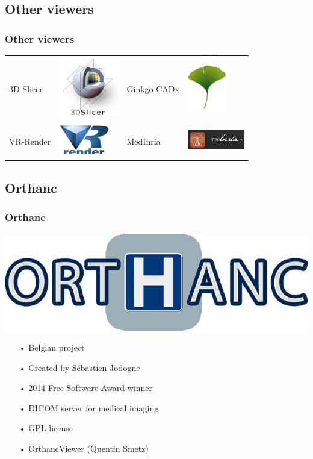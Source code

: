 \documentclass[11pt]{beamer}
\begin{document}
\subsection{Other viewers}

\begin{frame}
\frametitle{Other viewers}
\begin{tabular}{>{\centering\arraybackslash}m{} >{\centering\arraybackslash}m{} >{\centering\arraybackslash}m{} >{\centering\arraybackslash}m{}}
3D Slicer & \includegraphics[width=2.6cm]{slicer.png} & Ginkgo CADx & \includegraphics[width=1.7cm]{ginkgo.png}\\
VR-Render & \includegraphics[width=2.2cm]{vrrender.png} & MedInria & \includegraphics[width=2.5cm]{medinria.png}
\end{tabular}
\end{frame}

\subsection{Orthanc}

\begin{frame}
\frametitle{Orthanc}
\includegraphics[scale=0.15]{Orthanc.png}
\begin{itemize}
\item[•] Belgian project
\item[•] Created by Sébastien Jodogne
\item[•] 2014 Free Software Award winner
\item[•] DICOM server for medical imaging
\item[•] GPL license
\item[•] OrthancViewer (Quentin Smetz)
\end{itemize}
\end{frame}
\end{document}
